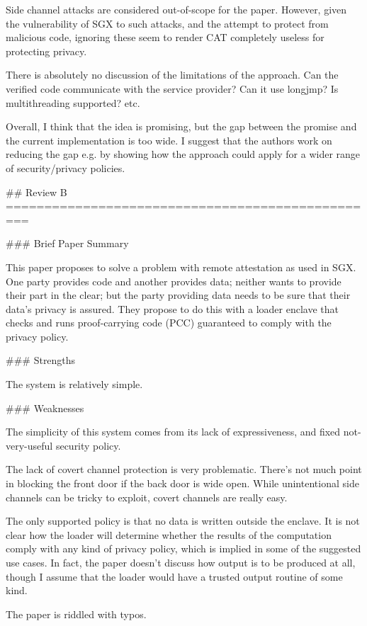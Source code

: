 \begin{markdown}
Side channel attacks are considered out-of-scope for the paper. However, given the vulnerability of SGX to such attacks, and the attempt to protect from malicious code, ignoring these seem to render CAT completely useless for protecting privacy.

There is absolutely no discussion of the limitations of the approach. Can the verified code communicate with the service provider? Can it use longjmp? Is multithreading supported? etc.

Overall, I think that the idea is promising, but the gap between the promise and the current implementation is too wide.  I suggest that the authors work on reducing the gap e.g. by showing how the approach could apply for a wider range of security/privacy policies.



## Review B
=================================================



### Brief Paper Summary

This paper proposes to solve a problem with remote attestation as used in SGX. One party provides code and another provides data; neither wants to provide their part in the clear; but the party providing data needs to be sure that their data's privacy is assured.  They propose to do this with a loader enclave that checks and runs proof-carrying code (PCC) guaranteed to comply with the privacy policy.

### Strengths

The system is relatively simple.

### Weaknesses

The simplicity of this system comes from its lack of expressiveness, and fixed not-very-useful security policy.

The lack of covert channel protection is very problematic.  There's not much point in blocking the front door if the back door is wide open.  While unintentional side channels can be tricky to exploit, covert channels are really easy.

The only supported policy is that no data is written outside the enclave.  It is not clear how the loader will determine whether the results of the computation comply with any kind of privacy policy, which is implied in some of the suggested use cases.  In fact, the paper doesn't discuss how output is to be produced at all, though I assume that the loader would have a trusted output routine of some kind.

The paper is riddled with typos.


\end{markdown}
